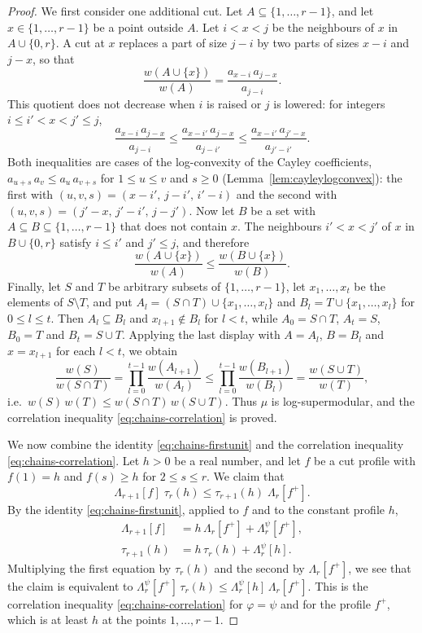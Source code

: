 \documentclass{amsart}
\theoremstyle{definition}
\theoremstyle{remark}
\numberwithin{equation}{section}
\begin{document}
\begin{proof}
We first consider one additional cut. Let $A\subseteq\{1,\dots,r-1\}$, and let $x\in\{1,\dots,r-1\}$ be a point outside $A$. Let $i<x<j$ be the neighbours of $x$ in $A\cup\{0,r\}$. A cut at $x$ replaces a part of size $j-i$ by two parts of sizes $x-i$ and $j-x$, so that
\[
\frac{w(A\cup\{x\})}{w(A)}=\frac{a_{x-i}\,a_{j-x}}{a_{j-i}}.
\]
This quotient does not decrease when $i$ is raised or $j$ is lowered: for integers $i\le i'<x<j'\le j$,
\[
\frac{a_{x-i}\,a_{j-x}}{a_{j-i}}\le\frac{a_{x-i'}\,a_{j-x}}{a_{j-i'}}\le\frac{a_{x-i'}\,a_{j'-x}}{a_{j'-i'}}.
\]
Both inequalities are cases of the log-convexity of the Cayley coefficients, $a_{u+s}\,a_v\le a_u\,a_{v+s}$ for $1\le u\le v$ and $s\ge 0$ (Lemma~\ref{lem:cayleylogconvex}): the first with $(u,v,s)=(x-i',\,j-i',\,i'-i)$ and the second with $(u,v,s)=(j'-x,\,j'-i',\,j-j')$. Now let $B$ be a set with $A\subseteq B\subseteq\{1,\dots,r-1\}$ that does not contain $x$. The neighbours $i'<x<j'$ of $x$ in $B\cup\{0,r\}$ satisfy $i\le i'$ and $j'\le j$, and therefore
\[
\frac{w(A\cup\{x\})}{w(A)}\le\frac{w(B\cup\{x\})}{w(B)}.
\]
Finally, let $S$ and $T$ be arbitrary subsets of $\{1,\dots,r-1\}$, let $x_1,\dots,x_t$ be the elements of $S\setminus T$, and put $A_l=(S\cap T)\cup\{x_1,\dots,x_l\}$ and $B_l=T\cup\{x_1,\dots,x_l\}$ for $0\le l\le t$. Then $A_l\subseteq B_l$ and $x_{l+1}\notin B_l$ for $l<t$, while $A_0=S\cap T$, $A_t=S$, $B_0=T$ and $B_t=S\cup T$. Applying the last display with $A=A_l$, $B=B_l$ and $x=x_{l+1}$ for each $l<t$, we obtain
\[
\frac{w(S)}{w(S\cap T)}=\prod_{l=0}^{t-1}\frac{w(A_{l+1})}{w(A_l)}\le\prod_{l=0}^{t-1}\frac{w(B_{l+1})}{w(B_l)}=\frac{w(S\cup T)}{w(T)},
\]
i.e.\ $w(S)\,w(T)\le w(S\cap T)\,w(S\cup T)$. Thus $\mu$ is log-supermodular, and the correlation inequality \eqref{eq:chains-correlation} is proved.

We now combine the identity \eqref{eq:chains-firstunit} and the correlation inequality \eqref{eq:chains-correlation}. Let $h>0$ be a real number, and let $f$ be a cut profile with $f(1)=h$ and $f(s)\ge h$ for $2\le s\le r$. We claim that
\[
\Lambda_{r+1}[f]\;\tau_r(h)\le\tau_{r+1}(h)\;\Lambda_r[f^{+}].
\]
By the identity \eqref{eq:chains-firstunit}, applied to $f$ and to the constant profile $h$,
\begin{align*}
\Lambda_{r+1}[f]&=h\,\Lambda_r[f^{+}]+\Lambda^{\psi}_r[f^{+}],\\
\tau_{r+1}(h)&=h\,\tau_r(h)+\Lambda^{\psi}_r[h].
\end{align*}
Multiplying the first equation by $\tau_r(h)$ and the second by $\Lambda_r[f^{+}]$, we see that the claim is equivalent to $\Lambda^{\psi}_r[f^{+}]\,\tau_r(h)\le\Lambda^{\psi}_r[h]\,\Lambda_r[f^{+}]$. This is the correlation inequality \eqref{eq:chains-correlation} for $\varphi=\psi$ and for the profile $f^{+}$, which is at least $h$ at the points $1,\dots,r-1$.


\end{proof}
\end{document}
